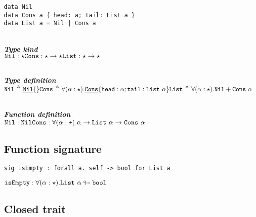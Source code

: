 \documentclass{article}[11pt]
\newcommand{\subsubsubsection}[1]
{
    ~\\
    {\bf {\em #1}} \\
}
\newcommand{\term}[1]{\verb~#1~}
\newcommand{\cons}[1]{\underline{\verb~#1~}}
\begin{document}
    \begin{verbatim}
data Nil
data Cons a { head: a; tail: List a }
data List a = Nil | Cons a
    \end{verbatim}

    \subsubsubsection{Type kind}

    \noindent\begin{math}
                 \term{Nil} : \star \\
                 \term{Cons} : \star \rightarrow \star \\
                 \term{List} : \star \rightarrow \star
    \end{math}

    \subsubsubsection{Type definition}

    \noindent\begin{math}
                 \term{Nil} \triangleq \cons{Nil}\{\} \\
                 \term{Cons} \triangleq \forall(\alpha:\star).\cons{Cons}\{ \term{head} :\alpha; \term{tail} : \term{List}~\alpha \} \\
                 \term{List} \triangleq \forall(\alpha:\star).\term{Nil} + \term{Cons}~\alpha
    \end{math}

    \subsubsubsection{Function definition}

    \noindent\begin{math}
                 \term{Nil} : \term{Nil} \\
                 \term{Cons} : \forall(\alpha:\star).\alpha \rightarrow \term{List}~\alpha \rightarrow \term{Cons} ~ \alpha \\
    \end{math}

    \subsection{Function signature}\label{subsec:function-signature}

    \begin{verbatim}
sig isEmpty : forall a. self -> bool for List a
    \end{verbatim}

    \noindent\begin{math}
                 \term{isEmpty} : \forall(\alpha:\star).\term{List}~\alpha \looparrowright \term{bool}
    \end{math}

    \subsection{Closed trait}\label{subsec:closed-trait}
\end{document}
